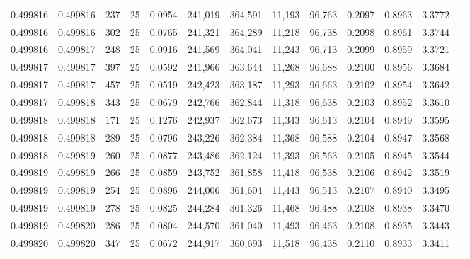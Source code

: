 \begin{tabular}{rrrrrrrrrrrrr}
0.499816 & 0.499816 &   237 &  25 &                                     0.0954 & 241,019 & 364,591 &  11,193 &  96,763 & 0.2097 & 0.8963 & 3.3772 \\
0.499816 & 0.499816 &   302 &  25 &                                     0.0765 & 241,321 & 364,289 &  11,218 &  96,738 & 0.2098 & 0.8961 & 3.3744 \\
0.499816 & 0.499817 &   248 &  25 &                                     0.0916 & 241,569 & 364,041 &  11,243 &  96,713 & 0.2099 & 0.8959 & 3.3721 \\
0.499817 & 0.499817 &   397 &  25 &                                     0.0592 & 241,966 & 363,644 &  11,268 &  96,688 & 0.2100 & 0.8956 & 3.3684 \\
0.499817 & 0.499817 &   457 &  25 &                                     0.0519 & 242,423 & 363,187 &  11,293 &  96,663 & 0.2102 & 0.8954 & 3.3642 \\
0.499817 & 0.499818 &   343 &  25 &                                     0.0679 & 242,766 & 362,844 &  11,318 &  96,638 & 0.2103 & 0.8952 & 3.3610 \\
0.499818 & 0.499818 &   171 &  25 &                                     0.1276 & 242,937 & 362,673 &  11,343 &  96,613 & 0.2104 & 0.8949 & 3.3595 \\
0.499818 & 0.499818 &   289 &  25 &                                     0.0796 & 243,226 & 362,384 &  11,368 &  96,588 & 0.2104 & 0.8947 & 3.3568 \\
0.499818 & 0.499819 &   260 &  25 &                                     0.0877 & 243,486 & 362,124 &  11,393 &  96,563 & 0.2105 & 0.8945 & 3.3544 \\
0.499819 & 0.499819 &   266 &  25 &                                     0.0859 & 243,752 & 361,858 &  11,418 &  96,538 & 0.2106 & 0.8942 & 3.3519 \\
0.499819 & 0.499819 &   254 &  25 &                                     0.0896 & 244,006 & 361,604 &  11,443 &  96,513 & 0.2107 & 0.8940 & 3.3495 \\
0.499819 & 0.499819 &   278 &  25 &                                     0.0825 & 244,284 & 361,326 &  11,468 &  96,488 & 0.2108 & 0.8938 & 3.3470 \\
0.499819 & 0.499820 &   286 &  25 &                                     0.0804 & 244,570 & 361,040 &  11,493 &  96,463 & 0.2108 & 0.8935 & 3.3443 \\
0.499820 & 0.499820 &   347 &  25 &                                     0.0672 & 244,917 & 360,693 &  11,518 &  96,438 & 0.2110 & 0.8933 & 3.3411 \\

\end{tabular}
